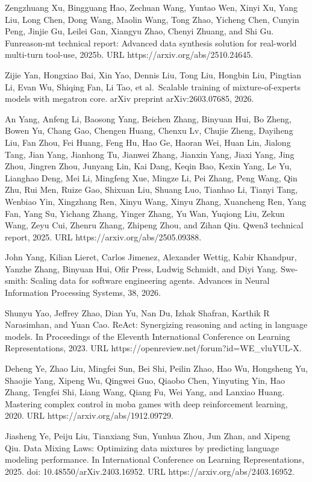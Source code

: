 \documentclass[
  10
]{article}
\begin{document}
Zengzhuang Xu, Bingguang Hao, Zechuan Wang, Yuntao Wen, Xinyi Xu, Yang
Liu, Long Chen, Dong Wang, Maolin Wang, Tong Zhao, Yicheng Chen, Cunyin
Peng, Jinjie Gu, Leilei Gan, Xiangyu Zhao, Chenyi Zhuang, and Shi Gu.
Funreason-mt technical report: Advanced data synthesis solution for
real-world multi-turn tool-use, 2025b. URL
https://arxiv.org/abs/2510.24645.

Zijie Yan, Hongxiao Bai, Xin Yao, Dennis Liu, Tong Liu, Hongbin Liu,
Pingtian Li, Evan Wu, Shiqing Fan, Li Tao, et al.~Scalable training of
mixture-of-experts models with megatron core. arXiv preprint
arXiv:2603.07685, 2026.

An Yang, Anfeng Li, Baosong Yang, Beichen Zhang, Binyuan Hui, Bo Zheng,
Bowen Yu, Chang Gao, Chengen Huang, Chenxu Lv, Chujie Zheng, Dayiheng
Liu, Fan Zhou, Fei Huang, Feng Hu, Hao Ge, Haoran Wei, Huan Lin, Jialong
Tang, Jian Yang, Jianhong Tu, Jianwei Zhang, Jianxin Yang, Jiaxi Yang,
Jing Zhou, Jingren Zhou, Junyang Lin, Kai Dang, Keqin Bao, Kexin Yang,
Le Yu, Lianghao Deng, Mei Li, Mingfeng Xue, Mingze Li, Pei Zhang, Peng
Wang, Qin Zhu, Rui Men, Ruize Gao, Shixuan Liu, Shuang Luo, Tianhao Li,
Tianyi Tang, Wenbiao Yin, Xingzhang Ren, Xinyu Wang, Xinyu Zhang,
Xuancheng Ren, Yang Fan, Yang Su, Yichang Zhang, Yinger Zhang, Yu Wan,
Yuqiong Liu, Zekun Wang, Zeyu Cui, Zhenru Zhang, Zhipeng Zhou, and Zihan
Qiu. Qwen3 technical report, 2025. URL https://arxiv.org/abs/2505.09388.

John Yang, Kilian Lieret, Carlos Jimenez, Alexander Wettig, Kabir
Khandpur, Yanzhe Zhang, Binyuan Hui, Ofir Press, Ludwig Schmidt, and
Diyi Yang. Swe-smith: Scaling data for software engineering agents.
Advances in Neural Information Processing Systems, 38, 2026.

Shunyu Yao, Jeffrey Zhao, Dian Yu, Nan Du, Izhak Shafran, Karthik R
Narasimhan, and Yuan Cao. ReAct: Synergizing reasoning and acting in
language models. In Proceedings of the Eleventh International Conference
on Learning Representations, 2023. URL
https://openreview.net/forum?id=WE\_vluYUL-X.

Deheng Ye, Zhao Liu, Mingfei Sun, Bei Shi, Peilin Zhao, Hao Wu,
Hongsheng Yu, Shaojie Yang, Xipeng Wu, Qingwei Guo, Qiaobo Chen,
Yinyuting Yin, Hao Zhang, Tengfei Shi, Liang Wang, Qiang Fu, Wei Yang,
and Lanxiao Huang. Mastering complex control in moba games with deep
reinforcement learning, 2020. URL https://arxiv.org/abs/1912.09729.

Jiasheng Ye, Peiju Liu, Tianxiang Sun, Yunhua Zhou, Jun Zhan, and Xipeng
Qiu. Data Mixing Laws: Optimizing data mixtures by predicting language
modeling performance. In International Conference on Learning
Representations, 2025. doi: 10.48550/arXiv.2403.16952. URL
https://arxiv.org/abs/2403.16952.
\end{document}
